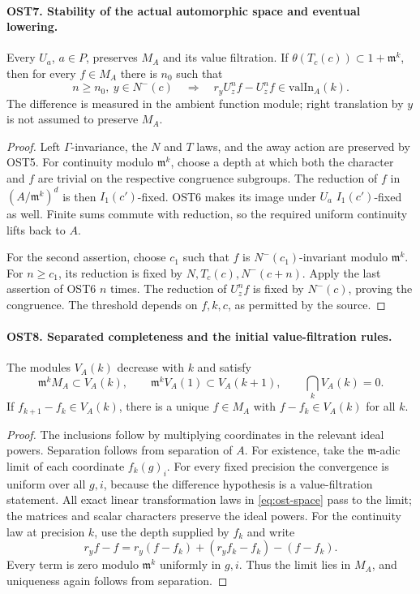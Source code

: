 \documentclass[11pt,a4paper]{article}
\numberwithin{equation}{section}
\theoremstyle{remark}\newtheorem{remark}[theorem]{Remark}
\begin{document}
\paragraph{OST7. Stability of the actual automorphic space and eventual lowering.}
\label{claim:OST7}
Every $U_a$, $a\in P$, preserves $M_A$ and its value
filtration.  If $\theta(T_c(c))\subset1+\mathfrak m^k$,
then for every $f\in M_A$ there is $n_0$ such that
\begin{equation}\label{eq:ost-eventual-lowering}
 n\geq n_0,\ y\in N^-(c)
    \quad\Longrightarrow\quad
        r_yU_z^nf-U_z^nf\in\mathrm{valIn}_A(k).
\end{equation}
The difference is measured in the ambient function module;
right translation by $y$ is not assumed to preserve $M_A$.
\begin{proof}
Left $\Gamma$-invariance, the $N$ and $T$ laws, and the
away action are preserved by OST5.  For continuity modulo
$\mathfrak m^k$, choose a depth at which both the character
and $f$ are trivial on the respective congruence subgroups.
The reduction of $f$ in $(A/\mathfrak m^k)^d$ is then
$I_1(c')$-fixed.  OST6 makes its image under $U_a$
$I_1(c')$-fixed as well.  Finite sums commute with reduction,
so the required uniform continuity lifts back to $A$.

For the second assertion, choose $c_1$ such that $f$ is
$N^-(c_1)$-invariant modulo $\mathfrak m^k$.  For $n\geq c_1$,
its reduction is fixed by $N,\allowbreak{} T_c(c),\allowbreak{} N^-(c+n)$.
Apply the last assertion of OST6 $n$ times.  The reduction of
$U_z^nf$ is fixed by $N^-(c)$, proving the congruence.
The threshold depends on $f,\allowbreak{} k,\allowbreak{} c$, as permitted by the source.
\end{proof}

\paragraph{OST8. Separated completeness and the initial value-filtration rules.}
\label{claim:OST8}
The modules $V_A(k)$ decrease with $k$ and satisfy
\[
 \mathfrak m^kM_A\subset V_A(k),\qquad
 \mathfrak m^kV_A(1)\subset V_A(k+1),\qquad
 \bigcap_kV_A(k)=0.
\]
If $f_{k+1}-f_k\in V_A(k)$, there is a unique $f\in M_A$
with $f-f_k\in V_A(k)$ for all $k$.
\begin{proof}
The inclusions follow by multiplying coordinates in the relevant
ideal powers.  Separation follows from separation of $A$.
For existence, take the $\mathfrak m$-adic limit of each
coordinate $f_k(g)_i$.  For every fixed precision the convergence
is uniform over all $g,\allowbreak{} i$, because the difference hypothesis is
a value-filtration statement.  All exact linear transformation
laws in \eqref{eq:ost-space} pass to the limit; the matrices and
scalar characters preserve the ideal powers.  For the continuity
law at precision $k$, use the depth supplied by $f_k$ and write
\[
 r_yf-f=r_y(f-f_k)+(r_yf_k-f_k)-(f-f_k).
\]
Every term is zero modulo $\mathfrak m^k$ uniformly in $g,\allowbreak{} i$.
Thus the limit lies in $M_A$, and uniqueness again follows
from separation.
\end{proof}
\end{document}
